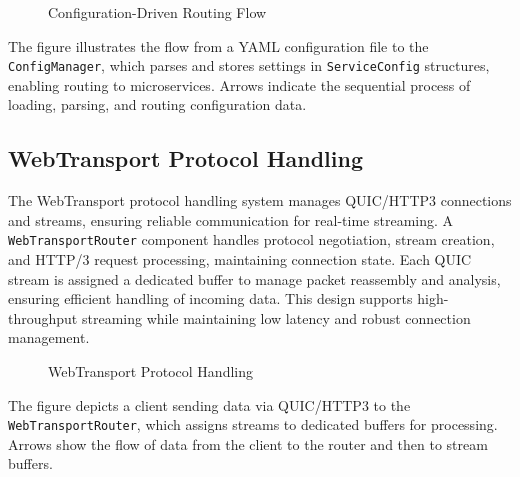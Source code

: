 {\begin{figure}[h]
\caption{Configuration-Driven Routing Flow}
\label{fig:config_routing}
\end{figure}

The figure illustrates the flow from a YAML configuration file to the \texttt{ConfigManager}, which parses and stores settings in \texttt{ServiceConfig} structures, enabling routing to microservices. Arrows indicate the sequential process of loading, parsing, and routing configuration data.

\subsection{WebTransport Protocol Handling}

The WebTransport protocol handling system manages QUIC/HTTP3 connections and streams, ensuring reliable communication for real-time streaming. A \texttt{WebTransportRouter} component handles protocol negotiation, stream creation, and HTTP/3 request processing, maintaining connection state. Each QUIC stream is assigned a dedicated buffer to manage packet reassembly and analysis, ensuring efficient handling of incoming data. This design supports high-throughput streaming while maintaining low latency and robust connection management.

\begin{figure}[h]
\centering
{}
\caption{WebTransport Protocol Handling}
\label{fig:webtransport}
\end{figure}

The figure depicts a client sending data via QUIC/HTTP3 to the \texttt{WebTransportRouter}, which assigns streams to dedicated buffers for processing. Arrows show the flow of data from the client to the router and then to stream buffers.

}
